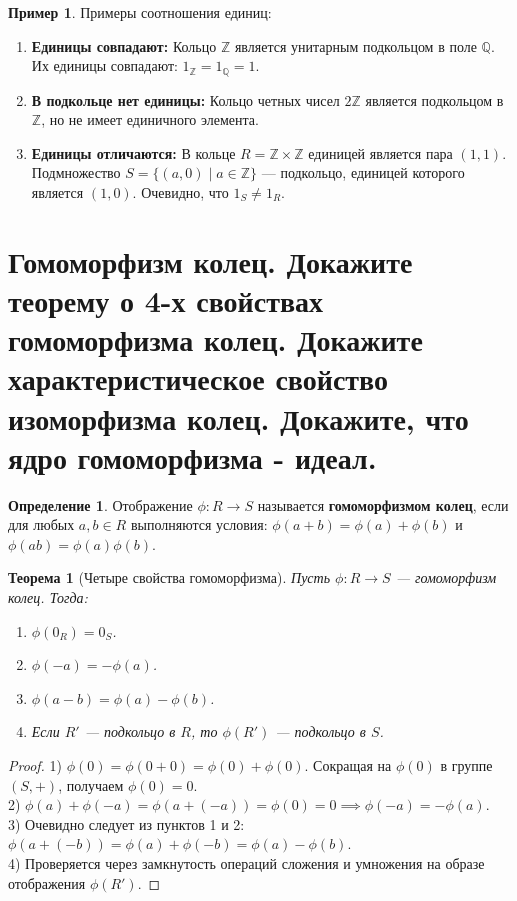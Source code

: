 \documentclass[12pt, a4paper]{article}
\theoremstyle{definition}
\newtheorem{definition}{Определение}[section]
\newtheorem{example}{Пример}[section]
\theoremstyle{plain}
\newtheorem{theorem}{Теорема}[section]
\begin{document}
	\begin{example}Примеры соотношения единиц:
		\begin{enumerate}
			\item \textbf{Единицы совпадают:} Кольцо $\mathbb{Z}$ является унитарным подкольцом в поле $\mathbb{Q}$. Их единицы совпадают: $1_{\mathbb{Z}} = 1_{\mathbb{Q}} = 1$.
			\item \textbf{В подкольце нет единицы:} Кольцо четных чисел $2\mathbb{Z}$ является подкольцом в $\mathbb{Z}$, но не имеет единичного элемента.
			\item \textbf{Единицы отличаются:} В кольце $R = \mathbb{Z} \times \mathbb{Z}$ единицей является пара $(1,1)$. Подмножество $S = \{(a,0) \mid a \in \mathbb{Z}\}$ — подкольцо, единицей которого является $(1,0)$. Очевидно, что $1_S \neq 1_R$.
		\end{enumerate}
	\end{example}
	
	\newpage
	\section{Гомоморфизм колец. Докажите теорему о 4-х свойствах гомоморфизма колец. Докажите характеристическое свойство изоморфизма колец. Докажите, что ядро гомоморфизма - идеал.}
	
	\begin{definition}
		Отображение $\phi: R \to S$ называется \textbf{гомоморфизмом колец}, если для любых $a, b \in R$ выполняются условия: $\phi(a+b) = \phi(a) + \phi(b)$ и $\phi(ab) = \phi(a)\phi(b)$.
	\end{definition}
	
	\begin{theorem}[Четыре свойства гомоморфизма]
		Пусть $\phi: R \to S$ — гомоморфизм колец. Тогда:
		\begin{enumerate}
			\item $\phi(0_R) = 0_S$.
			\item $\phi(-a) = -\phi(a)$.
			\item $\phi(a-b) = \phi(a)-\phi(b)$.
			\item Если $R'$ — подкольцо в $R$, то $\phi(R')$ — подкольцо в $S$.
		\end{enumerate}
	\end{theorem}
	\begin{proof}
		1) $\phi(0) = \phi(0+0) = \phi(0) + \phi(0)$. Сокращая на $\phi(0)$ в группе $(S, +)$, получаем $\phi(0) = 0$. \\
		2) $\phi(a) + \phi(-a) = \phi(a + (-a)) = \phi(0) = 0 \implies \phi(-a) = -\phi(a)$. \\
		3) Очевидно следует из пунктов 1 и 2: $\phi(a + (-b)) = \phi(a) + \phi(-b) = \phi(a) - \phi(b)$. \\
		4) Проверяется через замкнутость операций сложения и умножения на образе отображения $\phi(R')$.
	\end{proof}
	
\end{document}
